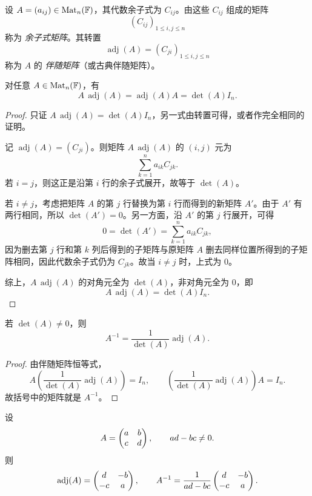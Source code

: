 \begin{definition}
设 $A=(a_{ij})\in\mathrm{Mat}_n(\mathbb{F})$，其代数余子式为 $C_{ij}$。由这些 $C_{ij}$ 组成的矩阵
\[
(C_{ij})_{1\le i,j\le n}
\]
称为 \emph{余子式矩阵}。其转置
\[
\operatorname{adj}(A)=(C_{ji})_{1\le i,j\le n}
\]
称为 $A$ 的 \emph{伴随矩阵}（或古典伴随矩阵）。
\end{definition}

\begin{theorem}[伴随矩阵恒等式]
对任意 $A\in\mathrm{Mat}_n(\mathbb{F})$，有
\[
A\,\operatorname{adj}(A)=\operatorname{adj}(A)A=\det(A)I_n.
\]
\end{theorem}

\begin{proof}
只证 $A\,\operatorname{adj}(A)=\det(A)I_n$，另一式由转置可得，或者作完全相同的证明。

记 $\operatorname{adj}(A)=(C_{ji})$。则矩阵 $A\,\operatorname{adj}(A)$ 的 $(i,j)$ 元为
\[
\sum_{k=1}^n a_{ik}C_{jk}.
\]
若 $i=j$，则这正是沿第 $i$ 行的余子式展开，故等于 $\det(A)$。

若 $i\ne j$，考虑把矩阵 $A$ 的第 $j$ 行替换为第 $i$ 行而得到的新矩阵 $A'$。由于 $A'$ 有两行相同，所以 $\det(A')=0$。另一方面，沿 $A'$ 的第 $j$ 行展开，可得
\[
0=\det(A')=\sum_{k=1}^n a_{ik}C_{jk},
\]
因为删去第 $j$ 行和第 $k$ 列后得到的子矩阵与原矩阵 $A$ 删去同样位置所得到的子矩阵相同，因此代数余子式仍为 $C_{jk}$。故当 $i\ne j$ 时，上式为 $0$。

综上，$A\,\operatorname{adj}(A)$ 的对角元全为 $\det(A)$，非对角元全为 $0$，即
\[
A\,\operatorname{adj}(A)=\det(A)I_n.
\]
\end{proof}

\begin{corollary}[逆矩阵公式]
若 $\det(A)\ne 0$，则
\[
A^{-1}=\frac{1}{\det(A)}\operatorname{adj}(A).
\]
\end{corollary}

\begin{proof}
由伴随矩阵恒等式，
\[
A\left(\frac{1}{\det(A)}\operatorname{adj}(A)\right)=I_n,
\qquad
\left(\frac{1}{\det(A)}\operatorname{adj}(A)\right)A=I_n.
\]
故括号中的矩阵就是 $A^{-1}$。
\end{proof}

\begin{example}
设
\[
A=\begin{pmatrix} a&b\\c&d \end{pmatrix},\qquad ad-bc\ne 0.
\]
则
\[
\operatorname{adj}(A)=\begin{pmatrix} d&-b\\-c&a \end{pmatrix},
\qquad
A^{-1}=\frac{1}{ad-bc}\begin{pmatrix} d&-b\\-c&a \end{pmatrix}.
\]
\end{example}

